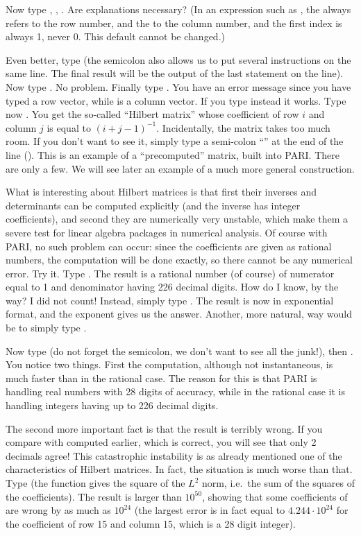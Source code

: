 Now type , , . Are explanations necessary?
(In an expression such as , the  always refers to the
row number, and the  to the column number, and the first index is
always 1, never 0. This default cannot be changed.)

Even better, type  (the semicolon also allows us to put
several instructions on the same line. The final result will be the output of
the last statement on the line). Now type . No
problem. Finally type . You have an error message since you
have typed a row vector, while  is a column vector. If you type
instead  it works. \smallskip
%
Type now . You get the so-called ``Hilbert matrix''
whose coefficient of row $i$ and column $j$ is equal to $(i+j-1)^{-1}$.
Incidentally, the matrix  takes too much room. If you don't want to
see it, simply type a semi-colon ``\kbd{;}'' at the end of the line
(). This is an example of a ``precomputed'' matrix,
built into PARI. There are only a few. We will see later an example of a much
more general construction.

What is interesting about Hilbert matrices is that first their inverses and
determinants can be computed explicitly (and the inverse has integer
coefficients), and second they are numerically very unstable, which make them
a severe test for linear algebra packages in numerical analysis.  Of course
with PARI, no such problem can occur: since the coefficients are given as
rational numbers, the computation will be done exactly, so there cannot be
any numerical error. Try it. Type . The result is a
rational number (of course) of numerator equal to 1 and denominator having
226 decimal digits. How do I know, by the way? I did not count! Instead,
simply type . The result is now in exponential format, and the
exponent gives us the answer. Another, more natural, way would be to simply
type .

Now type  (do not forget the semicolon, we don't want to see
all the junk!), then . You notice two things. First the
computation, although not instantaneous, is much faster than in the rational
case. The reason for this is that PARI is handling real numbers with 28
digits of accuracy, while in the rational case it is handling integers having
up to 226 decimal digits.

The second more important fact is that the result is terribly wrong. If you
compare with  computed earlier, which is correct, you will see
that only 2 decimals agree! This catastrophic instability is as already
mentioned one of the characteristics of Hilbert matrices. In fact, the
situation is much worse than that. Type  (the
function  gives the square of the $L^2$ norm, i.e.~the sum of the
squares of the coefficients). The result is larger than $10^{50}$, showing
that some coefficients of  are wrong by as much as $10^{24}$ (the
largest error is in fact equal to $4.244 \cdot 10^{24}$ for the coefficient
of row 15 and column 15, which is a 28 digit integer).

